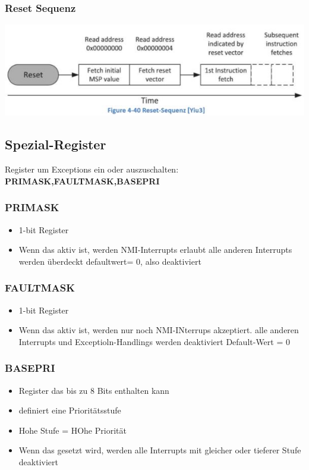 \subsubsection{Reset Sequenz}
     \includegraphics{images/resetsequenz}
\subsection{Spezial-Register}     
Register um Exceptions ein oder auszuschalten:\\
\textbf{\rightarrow PRIMASK,FAULTMASK,BASEPRI}
\begin{multicols}{2}
\subsubsection{PRIMASK}
\begin{itemize}
    \item 1-bit Register
    \item Wenn das aktiv ist, werden NMI-Interrupts erlaubt
    \subitem \rightarrow alle anderen Interrupts werden überdeckt
    \subitem \rightarrow defaultwert= 0, also deaktiviert
\end{itemize}

\subsubsection{FAULTMASK}
\begin{itemize}
    \item 1-bit Register
    \item Wenn das aktiv ist, werden nur noch NMI-INterrups akzeptiert.\newline
    alle anderen Interrupts und Exceptioln-Handlings werden deaktiviert
    \subitem \rightarrow Default-Wert = 0
\end{itemize}
\end{multicols}
\subsubsection{BASEPRI}
\begin{itemize}
    \item Register das bis zu 8 Bits enthalten kann
    \item definiert eine Prioritätsstufe
    \item Hohe Stufe = HOhe Priorität
    \item Wenn das gesetzt wird, werden alle Interrupts mit gleicher oder tieferer Stufe deaktiviert
\end{itemize}

